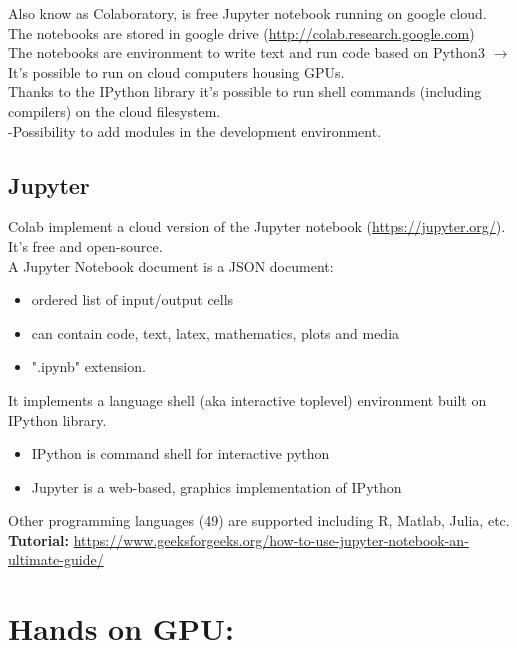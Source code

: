 Also know as Colaboratory, is free Jupyter notebook running on google cloud. The notebooks are stored in google drive (\url{http://colab.research.google.com})\\

The notebooks are environment to write
text and run code based on Python3 $\rightarrow$ It’s possible to run on cloud computers housing GPUs.\\

Thanks to the IPython library it’s possible to run shell commands (including compilers) on the cloud filesystem.\\

-Possibility to add modules in the
development environment.

\subsection{Jupyter}

Colab implement a cloud version of the Jupyter notebook (\url{https://jupyter.org/}). It’s free and open-source.\\
A Jupyter Notebook document is a JSON document:
\begin{itemize}
	\item ordered list of input/output cells
	\item can contain code, text, latex, mathematics, plots and media
	\item ".ipynb" extension.
\end{itemize}

It implements a language shell (aka interactive toplevel) environment built on IPython library.\\

\begin{itemize}
	\item IPython is command shell for interactive python
	\item Jupyter is a web-based, graphics implementation of IPython
\end{itemize}

Other programming languages (49) are supported including R, Matlab, Julia, etc.\\
\textbf{Tutorial:} \url{https://www.geeksforgeeks.org/how-to-use-jupyter-notebook-an-ultimate-guide/}

\section{Hands on GPU:}



